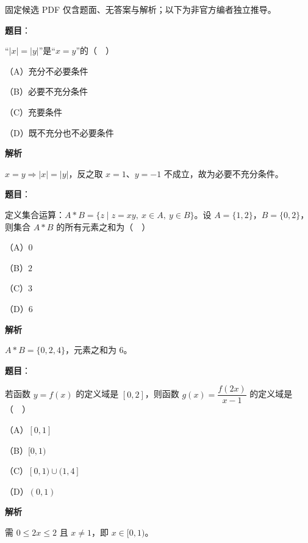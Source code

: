 

\begin{gktip}
固定候选 PDF 仅含题面、无答案与解析；以下为非官方编者独立推导。
\end{gktip}

\begin{answer}

\textbf{题目}：

“$|x|=|y|$”是“$x=y$”的（　）

（A）充分不必要条件

（B）必要不充分条件

（C）充要条件

（D）既不充分也不必要条件

\textbf{解析}

$x=y\Rightarrow|x|=|y|$，反之取 $x=1$、$y=-1$ 不成立，故为必要不充分条件。


\end{answer}
\begin{answer}

\textbf{题目}：

定义集合运算：$A*B=\{z\mid z=xy,\ x\in A,\ y\in B\}$。设 $A=\{1,2\}$，$B=\{0,2\}$，则集合 $A*B$ 的所有元素之和为（　）

（A）$0$

（B）$2$

（C）$3$

（D）$6$

\textbf{解析}

$A*B=\{0,2,4\}$，元素之和为 $6$。


\end{answer}
\begin{answer}

\textbf{题目}：

若函数 $y=f(x)$ 的定义域是 $[0,2]$，则函数 $g(x)=\dfrac{f(2x)}{x-1}$ 的定义域是（　）

（A）$[0,1]$

（B）$[0,1)$

（C）$[0,1)\cup(1,4]$

（D）$(0,1)$

\textbf{解析}

需 $0\leqslant2x\leqslant2$ 且 $x\neq1$，即 $x\in[0,1)$。


\end{answer}
